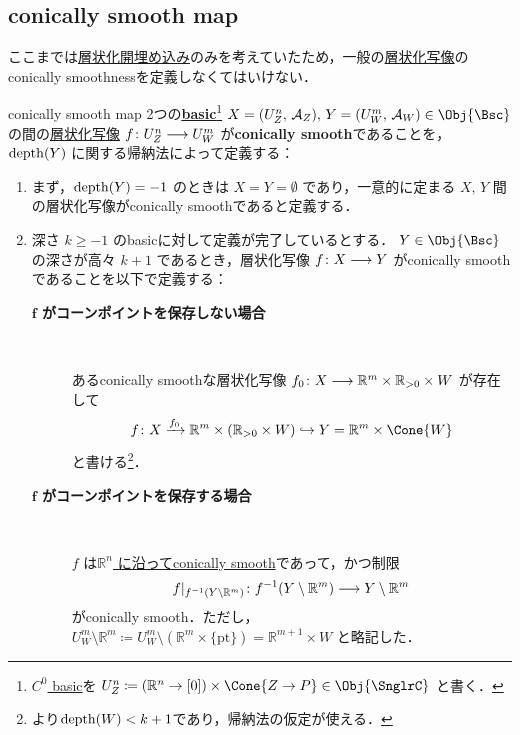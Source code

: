 \documentclass[TQFT_main]{subfiles}
\begin{document}
\subsection{conically smooth map}

ここまでは\hyperref[def:strat-emb]{層状化開埋め込み}のみを考えていたため，一般の\hyperref[def:stratified-space]{層状化写像}のconically smoothnessを定義しなくてはいけない．

\begin{mydef}[label=def:c-smooth-map]{conically smooth map}
    2つの\hyperref[def:Snglr]{\underline{\textbf{basic}}}\footnote{\hyperref[def:C0-basic]{$C^0$ basic}を $U^n_Z \coloneqq (\mathbb{R}^n \to [0]) \times \Cone{Z \to P} \in \Obj{\SnglrC}$ と書く．} $X = (U^n_Z,\, \mathcal{A}_Z),\, Y = (U^m_W,\, \mathcal{A}_W)\in \Obj{\Bsc}$ の間の\hyperref[def:stratified-space]{層状化写像} $f \colon U^n_Z \longrightarrow U^m_W$ が\textbf{conically smooth}であることを，
    \hyperref[def:dim-depth]{$\operatorname{depth} (Y)$} に関する帰納法によって定義する：
    \begin{enumerate}
        \item まず，$\operatorname{depth} (Y) = -1$ のときは $X = Y = \emptyset$ であり，一意的に定まる $X,\, Y$ 間の層状化写像がconically smoothであると定義する．
        \item 深さ $k \ge -1$ のbasicに対して定義が完了しているとする．
        $Y \in \Obj{\Bsc}$ の深さが高々 $k+1$ であるとき，層状化写像 $f \colon X \longrightarrow Y$ がconically smoothであることを以下で定義する：
        \begin{description}
            \item[\textbf{$\bm{f}$ がコーンポイントを保存しない場合}]　  
            
            あるconically smoothな層状化写像 $f_0 \colon X \longrightarrow \mathbb{R}^m \times \mathbb{R}_{> 0} \times W$ が存在して
            \begin{align}
                f \colon X \xrightarrow{f_0} \mathbb{R}^m \times (\mathbb{R}_{> 0} \times W) \hookrightarrow Y = \mathbb{R}^m \times \Cone{W}
            \end{align}
            と書ける\footnote{より$\operatorname{depth}(W) < k+1$であり，帰納法の仮定が使える．}．
            
            \item[\textbf{$\bm{f}$ がコーンポイントを保存する場合}]　 
            
            $f$ は\hyperref[def:c-smooth-along]{$\mathbb{R}^n$ に沿ってconically smooth}であって，かつ制限
            \begin{align}
                f|_{f^{-1}(Y \setminus \mathbb{R}^m)} \colon f^{-1}(Y \setminus \mathbb{R}^m) \longrightarrow Y \setminus \mathbb{R}^m
            \end{align}
            がconically smooth．ただし，$U^m_W \setminus \mathbb{R}^m \coloneqq U^m_W \setminus (\mathbb{R}^m \times \{\mathrm{pt}\}) = \mathbb{R}^{m+1} \times W$ と略記した．
        \end{description}
    \end{enumerate}
    

\end{mydef}
\end{document}
